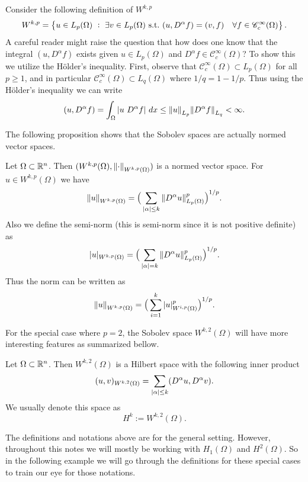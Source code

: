 \begin{beCareful}
	Consider the following definition of $ W^{k,p} $
	\[ W^{k,p} = \Set{u \in L_p(\Omega)\ :\ \exists v \in L_p(\Omega) \st (u,D^\alpha f) = (v,f) \quad \forall f \in \mathscr{C}^\infty_c(\Omega)}. \]
	A careful reader might raise the question that how does one know that the integral $ (u, D^\alpha f) $ exists given $ u \in L_p(\Omega) $ and $ D^\alpha f \in \mathscr{C}^\infty_c(\Omega) $? To show this we utilize the H\"{o}lder's inequality. First, observe that $ \mathscr{C}^\infty_c(\Omega) \subset L_p(\Omega)$ for all $ p\geq 1 $, and in particular $ \mathscr{C}^\infty_c(\Omega) \subset L_q(\Omega) $ where $ 1/q = 1-1/p $. Thus using the H\"{o}lder's inequality we can write
	\[ (u, D^\alpha f) = \int_\Omega |u\ D^\alpha f|\ dx \leq \norm{u}_{L_p} \norm{D^\alpha f}_{L_q} < \infty. \]
\end{beCareful}


The following proposition shows that the Sobolev spaces are actually normed vector spaces.

\begin{theorem}
	Let $ \Omega \subset \mathbb{R}^n $. Then $ (W^{k,p}(\Omega), \norm{\cdot}_{W^{k,p}(\Omega)}) $ is a normed vector space. For $ u \in W^{k,p}(\Omega) $ we have
	\[  \norm{u}_{W^{k,p}(\Omega)} = \big(\sum_{|\alpha|\leq k}\norm{D^\alpha u}^p_{L_p(\Omega)}\big)^{1/p}.  \]
	Also we define the semi-norm (this is semi-norm since it is not positive definite) as
	\[ |u|_{W^{k,p}(\Omega)} = \big(\sum_{|\alpha| =  k}\norm{D^\alpha u}^p_{L_p(\Omega)}\big)^{1/p}.\]
	Thus the norm can be written as 
	\[ \norm{u}_{W^{k,p}(\Omega)} = \big( \sum_{i=1}^{k}|u|^p_{W^{i,p}(\Omega)} \big)^{1/p}. \]
\end{theorem}
For the special case where $ p=2 $, the Sobolev space $ W^{k,2}(\Omega) $ will have more interesting features as summarized bellow.

\begin{proposition}
	Let $ \Omega \subset \mathbb{R}^n $. Then $ W^{k,2}(\Omega) $ is a Hilbert space with the following inner product
	\[ (u,v)_{W^{k,2}(\Omega)} = \sum_{|\alpha|\leq k}(D^\alpha u, D^\alpha v). \]
	We usually denote this space as
	\[  H^k := W^{k,2}(\Omega). \]
\end{proposition}

The definitions and notations above are for the general setting. However, throughout this notes we will mostly be working with $ H_1(\Omega) $ and $ H^2(\Omega) $. So in the following example we will go through the definitions for these special cases to train our eye for those notations.

